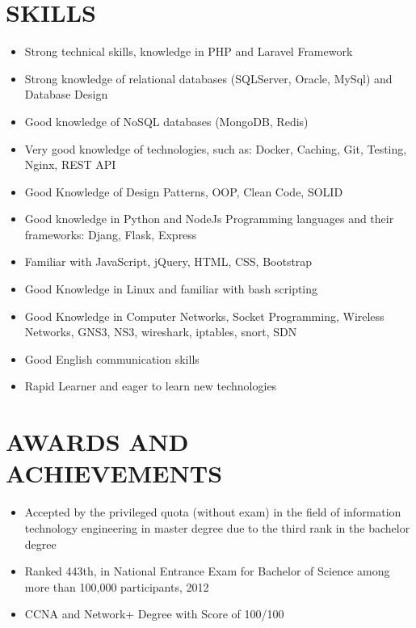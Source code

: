 \documentclass[11pt,a4paper,roman]{moderncv}
\begin{document}
{{{{\section{SKILLS}
\begin{minipage}{\maincolumnwidth}%
  \small{
      \begin{itemize}
          \item Strong technical skills, knowledge in PHP and Laravel Framework
          \item Strong knowledge of relational databases (SQLServer, Oracle, MySql) and Database Design
          \item Good knowledge of NoSQL databases (MongoDB, Redis)
           \item Very good knowledge of technologies, such as: Docker, Caching, Git, Testing, Nginx, REST API
            \item Good Knowledge of Design Patterns, OOP, Clean Code, SOLID
             \item Good knowledge in Python and NodeJs Programming languages and their frameworks: Djang, Flask, Express
              \item Familiar with JavaScript, jQuery, HTML, CSS, Bootstrap
               \item Good Knowledge in Linux and familiar with bash scripting
                \item Good Knowledge in Computer Networks, Socket Programming, Wireless Networks, GNS3, NS3, wireshark, iptables, snort, SDN
                \item Good English communication skills
                  \item Rapid Learner and eager to learn new technologies
    \end{itemize}}%
\end{minipage}%
      
}


\section{AWARDS AND ACHIEVEMENTS}
\begin{minipage}{\maincolumnwidth}%
  \small{
      \begin{itemize}
          \item Accepted by the privileged quota (without exam) in the field of information technology engineering in master degree due to the third rank in the bachelor degree
          \item Ranked 443th, in National Entrance Exam for Bachelor of Science among more than 100,000 participants, 2012
          \item CCNA and Network+ Degree with Score of 100/100
    \end{itemize}}%
\end{minipage}%
      
}}}
\end{document}
